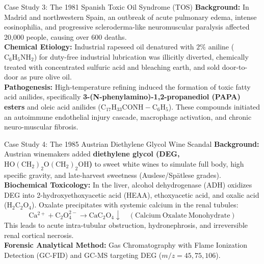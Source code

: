 \documentclass[11pt,a4paper,oneside]{article}
\begin{document}
\begin{casestudybox}{Case Study 3: The 1981 Spanish Toxic Oil Syndrome (TOS)}
\textbf{Background:} In Madrid and northwestern Spain, an outbreak of acute pulmonary edema, intense eosinophilia, and progressive scleroderma-like neuromuscular paralysis affected 20,000 people, causing over 600 deaths.\\
\textbf{Chemical Etiology:} Industrial rapeseed oil denatured with $2\%$ aniline ($\mathrm{C_6H_5NH_2}$) for duty-free industrial lubrication was illicitly diverted, chemically treated with concentrated sulfuric acid and bleaching earth, and sold door-to-door as pure olive oil.\\
\textbf{Pathogenesis:} High-temperature refining induced the formation of toxic fatty acid anilides, specifically \textbf{3-(N-phenylamino)-1,2-propanediol (PAPA) esters} and oleic acid anilides ($\mathrm{C_{17}H_{33}CONH-C_6H_5}$). These compounds initiated an autoimmune endothelial injury cascade, macrophage activation, and chronic neuro-muscular fibrosis.
\end{casestudybox}

\begin{casestudybox}{Case Study 4: The 1985 Austrian Diethylene Glycol Wine Scandal}
\textbf{Background:} Austrian winemakers added \textbf{diethylene glycol (DEG, $\mathrm{HO(CH_2)_2O(CH_2)_2OH}$)} to sweet white wines to simulate full body, high specific gravity, and late-harvest sweetness (Auslese/Spätlese grades).\\
\textbf{Biochemical Toxicology:} In the liver, alcohol dehydrogenase (ADH) oxidizes DEG into 2-hydroxyethoxyacetic acid (HEAA), ethoxyacetic acid, and oxalic acid ($\mathrm{H_2C_2O_4}$). Oxalate precipitates with systemic calcium in the renal tubules:
$$\mathrm{Ca^{2+} + C_2O_4^{2-} \longrightarrow CaC_2O_4 \downarrow \quad (Calcium\ Oxalate\ Monohydrate)}$$
This leads to acute intra-tubular obstruction, hydronephrosis, and irreversible renal cortical necrosis.\\
\textbf{Forensic Analytical Method:} Gas Chromatography with Flame Ionization Detection (GC-FID) and GC-MS targeting DEG ($m/z = 45, 75, 106$).
\end{casestudybox}
\end{document}
